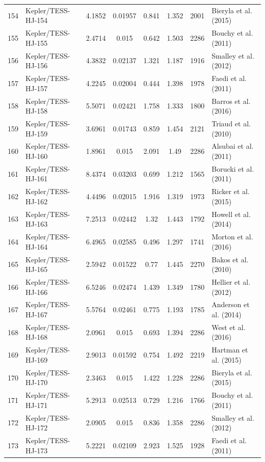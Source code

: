 \begin{longtable}{r l c c c c c p{4.2cm}}
154 & Kepler/TESS-HJ-154 & 4.1852 & 0.01957 & 0.841 & 1.352 & 2001 & Bieryla et al. (2015) \\
155 & Kepler/TESS-HJ-155 & 2.4714 & 0.015 & 0.642 & 1.503 & 2286 & Bouchy et al. (2011) \\
156 & Kepler/TESS-HJ-156 & 4.3832 & 0.02137 & 1.321 & 1.187 & 1916 & Smalley et al. (2012) \\
157 & Kepler/TESS-HJ-157 & 4.2245 & 0.02004 & 0.444 & 1.398 & 1978 & Faedi et al. (2011) \\
158 & Kepler/TESS-HJ-158 & 5.5071 & 0.02421 & 1.758 & 1.333 & 1800 & Barros et al. (2016) \\
159 & Kepler/TESS-HJ-159 & 3.6961 & 0.01743 & 0.859 & 1.454 & 2121 & Triaud et al. (2010) \\
160 & Kepler/TESS-HJ-160 & 1.8961 & 0.015 & 2.091 & 1.49 & 2286 & Alsubai et al. (2011) \\
161 & Kepler/TESS-HJ-161 & 8.4374 & 0.03203 & 0.699 & 1.212 & 1565 & Borucki et al. (2011) \\
162 & Kepler/TESS-HJ-162 & 4.4496 & 0.02015 & 1.916 & 1.319 & 1973 & Ricker et al. (2015) \\
163 & Kepler/TESS-HJ-163 & 7.2513 & 0.02442 & 1.32 & 1.443 & 1792 & Howell et al. (2014) \\
164 & Kepler/TESS-HJ-164 & 6.4965 & 0.02585 & 0.496 & 1.297 & 1741 & Morton et al. (2016) \\
165 & Kepler/TESS-HJ-165 & 2.5942 & 0.01522 & 0.77 & 1.445 & 2270 & Bakos et al. (2010) \\
166 & Kepler/TESS-HJ-166 & 6.5246 & 0.02474 & 1.439 & 1.349 & 1780 & Hellier et al. (2012) \\
167 & Kepler/TESS-HJ-167 & 5.5764 & 0.02461 & 0.775 & 1.193 & 1785 & Anderson et al. (2014) \\
168 & Kepler/TESS-HJ-168 & 2.0961 & 0.015 & 0.693 & 1.394 & 2286 & West et al. (2016) \\
169 & Kepler/TESS-HJ-169 & 2.9013 & 0.01592 & 0.754 & 1.492 & 2219 & Hartman et al. (2015) \\
170 & Kepler/TESS-HJ-170 & 2.3463 & 0.015 & 1.422 & 1.228 & 2286 & Bieryla et al. (2015) \\
171 & Kepler/TESS-HJ-171 & 5.2913 & 0.02513 & 0.729 & 1.216 & 1766 & Bouchy et al. (2011) \\
172 & Kepler/TESS-HJ-172 & 2.0905 & 0.015 & 0.836 & 1.358 & 2286 & Smalley et al. (2012) \\
173 & Kepler/TESS-HJ-173 & 5.2221 & 0.02109 & 2.923 & 1.525 & 1928 & Faedi et al. (2011) \\

\end{longtable}
